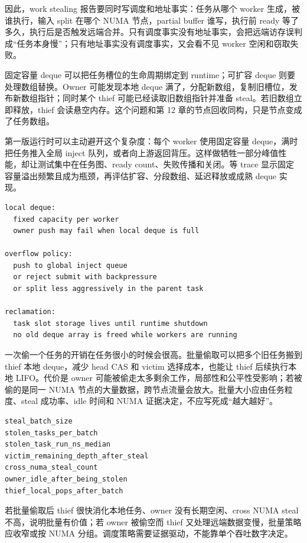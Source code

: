 因此，work stealing 报告要同时写调度和地址事实：任务从哪个 worker 生成，被谁执行，输入 split 在哪个 NUMA 节点，partial buffer 谁写，执行前 ready 等了多久，执行后是否触发远端合并。只有调度事实没有地址事实，会把远端访存误判成“任务本身慢”；只有地址事实没有调度事实，又会看不见 worker 空闲和窃取失败。

固定容量 deque 可以把任务槽位的生命周期绑定到 runtime；可扩容 deque 则要处理数组替换。Owner 可能发现本地 deque 满了，分配新数组，复制旧槽位，发布新数组指针；同时某个 thief 可能已经读取旧数组指针并准备 steal。若旧数组立即释放，thief 会读悬空内存。这个问题和第 12 章的节点回收同构，只是节点变成了任务数组。

第一版运行时可以主动避开这个复杂度：每个 worker 使用固定容量 deque，满时把任务推入全局 inject 队列，或者向上游返回背压。这样做牺牲一部分峰值性能，却让测试集中在任务图、ready count、失败传播和关闭。等 trace 显示固定容量溢出频繁且成为瓶颈，再评估扩容、分段数组、延迟释放或成熟 deque 实现。

\begin{lstlisting}[numbers=none,caption={第一版 work stealing 的容量合同}]
local deque:
  fixed capacity per worker
  owner push may fail when local deque is full

overflow policy:
  push to global inject queue
  or reject submit with backpressure
  or split less aggressively in the parent task

reclamation:
  task slot storage lives until runtime shutdown
  no old deque array is freed while workers are running
\end{lstlisting}

一次偷一个任务的开销在任务很小的时候会很高。批量偷取可以把多个旧任务搬到 thief 本地 deque，减少 head CAS 和 victim 选择成本，也能让 thief 后续执行本地 LIFO。代价是 owner 可能被偷走太多剩余工作，局部性和公平性受影响；若被偷的是同一 NUMA 节点的大量数据，跨节点流量会放大。批量大小应由任务粒度、steal 成功率、idle 时间和 NUMA 证据决定，不应写死成“越大越好”。

\begin{lstlisting}[numbers=none,caption={批量偷取的判读字段}]
steal_batch_size
stolen_tasks_per_batch
stolen_task_run_ns_median
victim_remaining_depth_after_steal
cross_numa_steal_count
owner_idle_after_being_stolen
thief_local_pops_after_batch
\end{lstlisting}

若批量偷取后 thief 很快消化本地任务、owner 没有长期空闲、cross NUMA steal 不高，说明批量有价值；若 owner 被偷空而 thief 又处理远端数据变慢，批量策略应收窄或按 NUMA 分组。调度策略需要证据驱动，不能靠单个吞吐数字决定。

